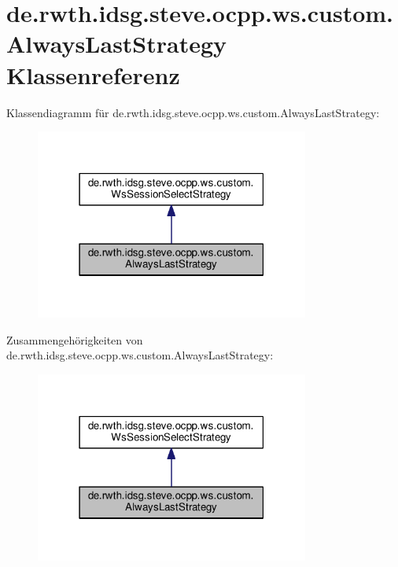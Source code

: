\hypertarget{classde_1_1rwth_1_1idsg_1_1steve_1_1ocpp_1_1ws_1_1custom_1_1_always_last_strategy}{\section{de.\+rwth.\+idsg.\+steve.\+ocpp.\+ws.\+custom.\+Always\+Last\+Strategy Klassenreferenz}
\label{classde_1_1rwth_1_1idsg_1_1steve_1_1ocpp_1_1ws_1_1custom_1_1_always_last_strategy}
}


Klassendiagramm für de.\+rwth.\+idsg.\+steve.\+ocpp.\+ws.\+custom.\+Always\+Last\+Strategy\+:\nopagebreak
\begin{figure}[H]
\begin{center}
\leavevmode
\includegraphics[width=255pt]{classde_1_1rwth_1_1idsg_1_1steve_1_1ocpp_1_1ws_1_1custom_1_1_always_last_strategy__inherit__graph}
\end{center}
\end{figure}


Zusammengehörigkeiten von de.\+rwth.\+idsg.\+steve.\+ocpp.\+ws.\+custom.\+Always\+Last\+Strategy\+:\nopagebreak
\begin{figure}[H]
\begin{center}
\leavevmode
\includegraphics[width=255pt]{classde_1_1rwth_1_1idsg_1_1steve_1_1ocpp_1_1ws_1_1custom_1_1_always_last_strategy__coll__graph}
\end{center}
\end{figure}
